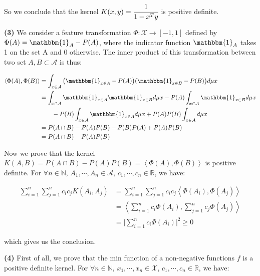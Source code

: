 \documentclass[11pt]{article}
\begin{document}
    So we conclude that the kernel $K(x,y)=\cfrac{1}{1-x^Ty}$ is positive definite.

    \textbf{(3)} We consider a feature transformation $\Phi: \mathcal{X} \to [-1, 1]$ defined by $\Phi (A) = \mathbbm{1}_A - P(A)$, 
    where the indicator function $\mathbbm{1}_A$ takes 1 on the set A and 0 otherwise.
    The inner product of this transformation between two set $A, B \subset \mathcal{A}$ is thus:

    \vspace{-4em}
    \begin{align*}
    \left \langle \Phi (A) , \Phi(B) \right \rangle &= \int_{x \in \mathcal{A}} \big (\mathbbm{1}_{x \in A} - P(A) \big ) (\mathbbm{1}_{x \in B} - P(B) \big ) d\mu x \\
    &= \int_{x \in \mathcal{A}} \mathbbm{1}_{x \in A}\mathbbm{1}_{x \in B} d\mu x - P(A) \int_{x \in \mathcal{A}} \mathbbm{1}_{x \in B} d\mu x \\
    &\mbox{\quad \quad} -P(B) \int_{x \in \mathcal{A}} \mathbbm{1}_{x \in A} d\mu x + P(A)P(B)\int_{x \in \mathcal{A}} d\mu x \\
    &= P(A \cap B) - P(A)P(B) - P(B)P(A) + P(A)P(B) \\
    &= P(A \cap B) - P(A)P(B)
    \end{align*}
    \vspace{-4em}

    Now we prove that the kernel $K(A, B) = P(A \cap B) - P(A)P(B) = \left \langle \Phi (A) , \Phi(B) \right \rangle$ is positive definite.
    For $\forall n \in \mathbb{N}$, $A_1, \cdots, A_n \in \mathcal{A}$, $c_1, \cdots, c_n \in \mathbb{R}$, we have:
 

    \vspace{-4em}
    \begin{align*}
      \sum_{i=1}^n \sum_{j=1}^n c_i c_j K(A_i, A_j) &= \sum_{i=1}^n \sum_{j=1}^n c_i c_j \left \langle \Phi (A_i) , \Phi (A_j) \right \rangle  \\
      &= \left \langle \sum_{i=1}^n c_i \Phi (A_i), \sum_{j=1}^n c_j \Phi (A_j) \right \rangle \\
      &= \Big |\sum_{i=1}^n c_i \Phi (A_i) \Big |^2 \ge 0
    \end{align*}
    \vspace{-4.5em}

    which gives us the conclusion.


    \textbf{(4)} First of all, we prove that the min function of a non-negative functions $f$ is a positive definite kernel.
    For $\forall n \in \mathbb{N}$, $x_1, \cdots, x_n \in \mathcal{X}$, $c_1, \cdots, c_n \in \mathbb{R}$, we have:
\end{document}
